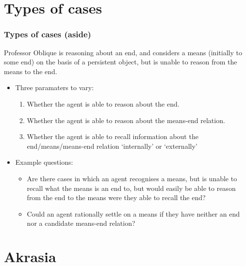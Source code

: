 \documentclass[noamssymb,
graphics,
]{beamer} %
\begin{document}
\section{Types of cases}

\begin{frame}
  \frametitle{Types of cases (aside)}

  Professor Oblique is reasoning about an end, and considers a means (initially to some end) on the basis of a persistent object, but is unable to reason from the means to the end.
  \begin{itemize}
  \item Three paramaters to vary:
    \begin{enumerate}
    \item Whether the agent is able to reason about the end.
    \item Whether the agent is able to reason about the means-end relation.
    \item Whether the agent is able to recall information about the end/means/means-end relation `internally' or `externally'
    \end{enumerate}
  \item Example questions:
    \begin{itemize}
    \item Are there cases in which an agent recognises a means, but is unable to recall what the means is an end to, but would easily be able to reason from the end to the means were they able to recall the end?
    \item Could an agent rationally settle on a means if they have neither an end nor a candidate means-end relation?
    \end{itemize}
  \end{itemize}
\end{frame}



\section{Akrasia}
\label{sec:akrasia}
\end{document}
